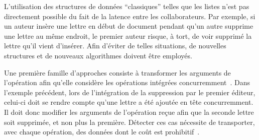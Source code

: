 %     


L'utilisation des structures de données ``classiques'' telles que les listes
n'est pas directement possible du fait de la latence entre les
collaborateurs. Par exemple, si un auteur insère une lettre en début de document
pendant qu'un autre supprime une lettre au même endroit, le premier auteur
risque, à tort, de voir supprimé la lettre qu'il vient d'insérer. Afin d'éviter
de telles situations, de nouvelles structures et de nouveaux algorithmes doivent
être employés.

Une première famille d'approches consiste à transformer les arguments de
l'opération afin qu'elle considère les opérations intégrées
concurremment~\cite{sun1998operational}. Dans l'exemple précédent, lors de
l'intégration de la suppression par le premier éditeur, celui-ci doit se rendre
compte qu'une lettre a été ajoutée en tête concurremment. Il doit donc modifier
les arguments de l'opération reçue afin que la seconde lettre soit supprimée, et
non plus la première. Détecter ces cas nécessite de transporter, avec chaque
opération, des données dont le coût est prohibitif~\cite{sun2009contextbased}.

